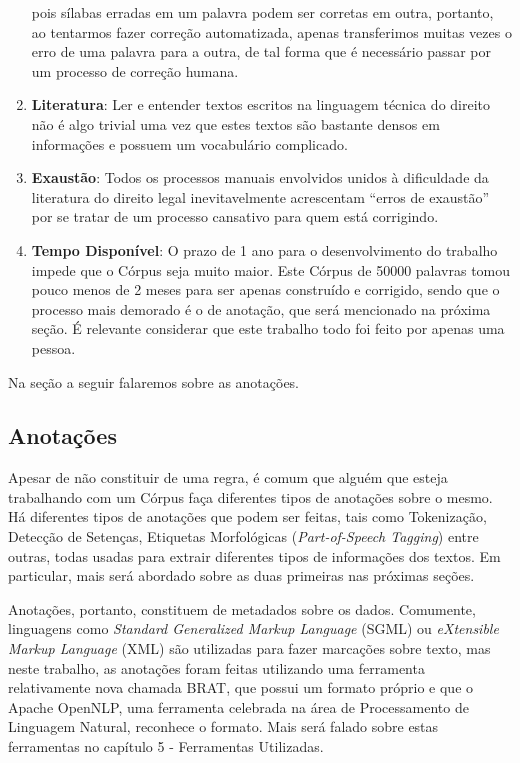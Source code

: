 \documentclass[11pt]{report}
\newcommand{\quotes}[1]{``#1''}
\begin{document}
\begin{enumerate}[label=\textbf{\arabic*.}]
  pois sílabas erradas em um palavra podem ser corretas em outra, portanto, ao tentarmos fazer correção automatizada, apenas transferimos muitas vezes o erro de uma palavra
  para a outra, de tal forma que é necessário passar por um processo de correção humana.
  \item \textbf{Literatura}: Ler e entender textos escritos na linguagem técnica do direito não é algo trivial uma vez que estes textos são bastante densos em informações e
  possuem um vocabulário complicado.
  \item \textbf{Exaustão}: Todos os processos manuais envolvidos unidos à dificuldade da literatura do direito legal inevitavelmente acrescentam \quotes{erros de exaustão}
  por se tratar de um processo cansativo para quem está corrigindo.
  \item \textbf{Tempo Disponível}: O prazo de 1 ano para o desenvolvimento do trabalho impede que o Córpus seja muito maior. Este Córpus de 50000 palavras tomou pouco menos de 2 meses
  para ser apenas construído e corrigido, sendo que o processo mais demorado é o de anotação, que será mencionado na próxima seção. É relevante considerar que este trabalho
  todo foi feito por apenas uma pessoa.
\end{enumerate}

Na seção a seguir falaremos sobre as anotações.

\subsection{Anotações}

\indent\indent Apesar de não constituir de uma regra, é comum que alguém que esteja trabalhando com um Córpus faça diferentes tipos de anotações sobre o mesmo.
Há diferentes tipos de anotações que podem ser feitas, tais como Tokenização, Detecção de Setenças, Etiquetas Morfológicas (\textit{Part-of-Speech Tagging}) entre outras, todas
usadas para extrair diferentes tipos de informações dos textos. Em particular, mais será abordado sobre as duas primeiras nas próximas seções.

Anotações, portanto, constituem de metadados sobre os dados. Comumente, linguagens como \textit{Standard Generalized Markup Language} (SGML) ou
\textit{eXtensible Markup Language} (XML) são utilizadas para fazer marcações sobre texto, mas
neste trabalho, as anotações foram feitas utilizando uma ferramenta relativamente nova chamada BRAT, que possui um
formato próprio e que o Apache OpenNLP, uma ferramenta celebrada na área de Processamento de Linguagem Natural, reconhece o formato.
Mais será falado sobre estas ferramentas no capítulo 5 - Ferramentas Utilizadas.
\end{document}
